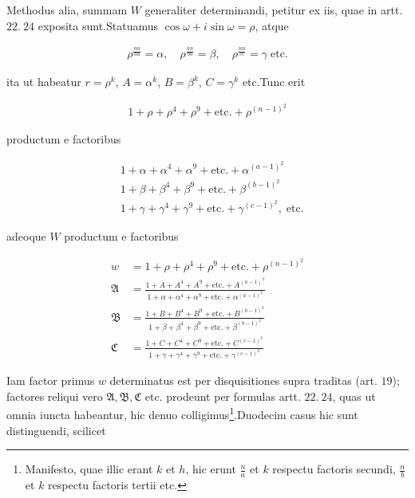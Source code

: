 
Methodus alia, summam $W$ generaliter determinandi, petitur ex iis, quae in artt. $22.\ 24$ exposita sunt.\quad Statuamus $\cos\omega+i\sin\omega=\rho$, atque

\[
\begin{aligned}
\rho^{\frac{nn}{aa}}=\alpha,\quad\rho^{\frac{nn}{bb}}=\beta,\quad\rho^{\frac{nn}{cc}}=\gamma\;\text{etc.}
\end{aligned}
\]

ita ut habeatur $r=\rho^k$, $A=\alpha^k$, $B=\beta^k$, $C=\gamma^k$ etc.\quad Tunc erit

\[
\begin{aligned}
1+\rho+\rho^4+\rho^9+\text{etc.}+\rho^{(n-1)^2}
\end{aligned}
\]

productum e factoribus

\[
\begin{aligned}
&1+\alpha+\alpha^4+\alpha^9+\text{etc.}+\alpha^{(a-1)^2}\\
&1+\beta+\beta^4+\beta^9+\text{etc.}+\beta^{(b-1)^2}\\
&1+\gamma+\gamma^4+\gamma^9+\text{etc.}+\gamma^{(c-1)^2},\;\text{etc.}
\end{aligned}
\]


adeoque $W$ productum e factoribus

\[
\begin{aligned}
w&=1+\rho+\rho^4+\rho^9+\text{etc.}+\rho^{(n-1)^2}\\[2pt]
\mathfrak A&=\frac{1+A+A^4+A^9+\text{etc.}+A^{(a-1)^2}}{1+\alpha+\alpha^4+\alpha^9+\text{etc.}+\alpha^{(a-1)^2}}\\[2pt]
\mathfrak B&=\frac{1+B+B^4+B^9+\text{etc.}+B^{(b-1)^2}}{1+\beta+\beta^4+\beta^9+\text{etc.}+\beta^{(b-1)^2}}\\[2pt]
\mathfrak C&=\frac{1+C+C^4+C^9+\text{etc.}+C^{(c-1)^2}}{1+\gamma+\gamma^4+\gamma^9+\text{etc.}+\gamma^{(c-1)^2}}
\end{aligned}
\]

Iam factor primus $w$ determinatus est per disquisitiones supra traditas (art. $19$); factores reliqui vero $\mathfrak A,\mathfrak B,\mathfrak C$ etc. prodeunt per formulas artt. $22.\ 24$, quas ut omnia iuncta habeantur, hic denuo colligimus\begingroup\renewcommand{\thefootnote}{*)}\footnote{Manifesto, quae illic erant $k$ et $h$, hic erunt $\frac{n}{a}$ et $k$ respectu factoris secundi, $\frac{n}{b}$ et $k$ respectu factoris tertii etc.}\endgroup.\quad Duodecim casus hic sunt distinguendi, scilicet

